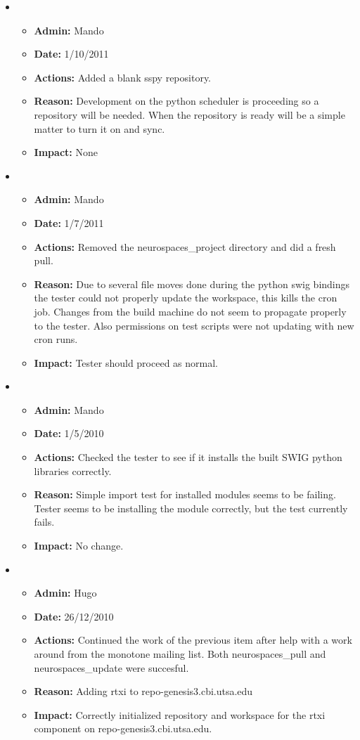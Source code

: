 \documentclass[12pt]{article}
\begin{document}
\begin{itemize}
\item
\begin{itemize}
\item[] {\bf Admin:} Mando
\item[] {\bf Date:} 1/10/2011 
\item[] {\bf Actions:} Added a blank sspy repository.
\item[] {\bf Reason:} Development on the python scheduler is proceeding so a repository will be needed. When the repository is ready will be a simple matter to turn it on and sync. 
\item[] {\bf Impact:} None
\end{itemize}

\item
\begin{itemize}
\item[] {\bf Admin:} Mando
\item[] {\bf Date:} 1/7/2011 
\item[] {\bf Actions:} Removed the neurospaces\_project directory and did a fresh pull.
\item[] {\bf Reason:} Due to several file moves done during the python swig bindings the tester could not properly update the workspace, this kills the cron job. Changes from the build machine do not seem to propagate properly to the tester. Also permissions on test scripts were not updating with new cron runs.
\item[] {\bf Impact:} Tester should proceed as normal.
\end{itemize}


\item
\begin{itemize}
\item[] {\bf Admin:} Mando
\item[] {\bf Date:} 1/5/2010 
\item[] {\bf Actions:} Checked the tester to see if it installs the built
SWIG python libraries correctly.
\item[] {\bf Reason:} Simple import test for installed modules seems to be failing. Tester seems to be installing the module correctly, but the test currently fails.
\item[] {\bf Impact:} No change.
\end{itemize}

\item
\begin{itemize}
\item[] {\bf Admin:} Hugo
\item[] {\bf Date:} 26/12/2010 
\item[] {\bf Actions:} Continued the work of the previous item after
  help with a work around from the monotone mailing list.  Both
  neurospaces\_pull and neurospaces\_update were succesful.
\item[] {\bf Reason:} Adding rtxi to repo-genesis3.cbi.utsa.edu
\item[] {\bf Impact:} Correctly initialized repository and workspace
  for the rtxi component on repo-genesis3.cbi.utsa.edu.
\end{itemize}



\end{itemize}
\end{document}
